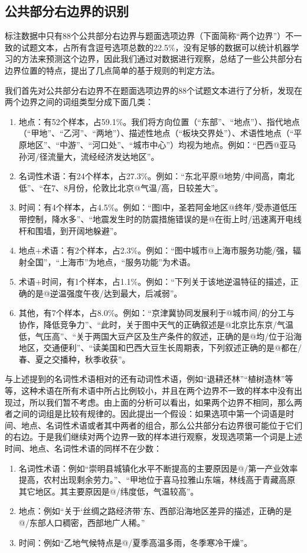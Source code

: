 \documentclass[master, winfont]{njuthesis}
\begin{document}
\subsection{公共部分右边界的识别}
\label{boundary_rec}
标注数据中只有88个公共部分右边界与题面选项边界（下面简称“两个边界”）不一致的试题文本，占所有含逗号选项总数的22.5\%，没有足够的数据可以统计机器学习的方法来预测这个边界，因此我们通过对数据进行观察，总结了一些公共部分右边界位置的特点，提出了几点简单的基于规则的判定方法。

我们首先对公共部分右边界不在题面选项边界的88个试题文本进行了分析，发现在两个边界之间的词组类型分成下面几类：
\begin{enumerate}
	\item 地点：有52个样本，占59.1\%。我们将方向位置（“东部”、“地点”）、指代地点（“甲地”、“乙河”、“两地”）、描述性地点（“板块交界处”）、术语性地点（“平原地区”、“中游”、“河口处”、“城市中心”）均视为地点。例如：“巴西@亚马孙河/径流量大，流经经济发达地区”。
	\item 名词性术语：有24个样本，占27.3\%。例如：“东北平原@地势/中间高，南北低”、“在7、8月份，伦敦比北京@气温/高，日较差大”。
	\item 时间：有4个样本，占4.5\%。例如：“图l中，圣若阿金地区@终年/受赤道低压带控制，降水多”、“地震发生时的防震措施错误的是@在街上时/迅速离开电线杆和围墙，到开阔地躲避”。
	\item 地点+术语：有2个样本，占2.3\%。例如：“图中城市@上海市服务功能/强，辐射全国”，“上海市”为地点，“服务功能”为术语。
	\item 术语+时间，有1个样本，占1.1\%。例如：“下列关于该地逆温特征的描述，正确的是@逆温强度午夜/达到最大，后减弱”。
	\item 其他，有7个样本，占8.0\%。例如：“京津冀协同发展利于@城市间/的分工与协作，降低竞争力”、“此时，关于图中天气的正确叙述是@北京比东京/气温低，气压高”、“关于两国大豆产区及生产条件的叙述，正确的是@均/位于沿海地区，交通便利”、“读美国和巴西大豆生长周期表，下列叙述正确的是@都在/春、夏之交播种，秋季收获”。
\end{enumerate}

与上述提到的名词性术语相对的还有动词性术语，例如“退耕还林”“植树造林”等等，这种术语在所有术语中所占比例较小，并且在两个边界不一致的样本中没有出现过，所以我们暂不考虑。由上面的分析可以看出，如果两个边界不相同，那么两者之间的词组是比较有规律的。因此提出一个假设：如果选项中第一个词语是时间、地点、名词性术语或者其中两者的组合，那么公共部分右边界很可能位于它们的右边。于是我们继续对两个边界一致的样本进行观察，发现选项第一个词是上述时间、地点、名词性术语的同样不在少数：
\begin{enumerate}
	\item 名词性术语：例如“崇明县城镇化水平不断提高的主要原因是@/第一产业效率提高，农村出现剩余劳力。”、“甲地位于喜马拉雅山东端，林线高于青藏高原其它地区。其主要原因是@/纬度低，气温较高”。
	\item 地点：例如“关于‘丝绸之路经济带’东、西部沿海地区差异的描述，正确的是@/东部人口稠密，西部地广人稀。”
	\item 时间：例如“乙地气候特点是@/夏季高温多雨，冬季寒冷干燥”。
\end{enumerate}
\end{document}
